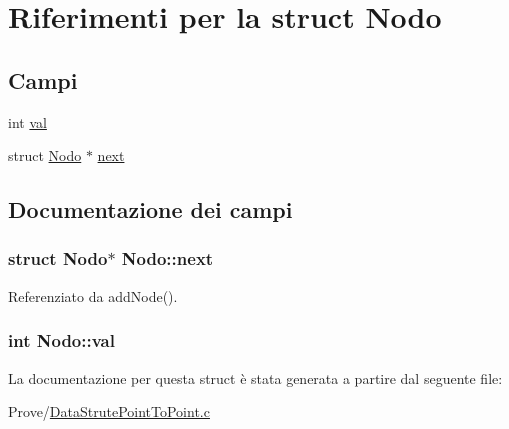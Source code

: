 \hypertarget{structNodo}{\section{Riferimenti per la struct Nodo}
\label{structNodo}
}
\subsection*{Campi}
\begin{DoxyCompactItemize}
\item 
int \hyperlink{structNodo_a8b3b2d0588fbc13d39d42ddcd0bd7a4f}{val}
\item 
struct \hyperlink{structNodo}{Nodo} $\ast$ \hyperlink{structNodo_a2cf9f6e7df85ad3e124ba92fcb784ad3}{next}
\end{DoxyCompactItemize}


\subsection{Documentazione dei campi}
\hypertarget{structNodo_a2cf9f6e7df85ad3e124ba92fcb784ad3}{
\subsubsection[{next}]{\setlength{\rightskip}{0pt plus 5cm}struct {\bf Nodo}$\ast$ Nodo\+::next}}\label{structNodo_a2cf9f6e7df85ad3e124ba92fcb784ad3}


Referenziato da add\+Node().

\hypertarget{structNodo_a8b3b2d0588fbc13d39d42ddcd0bd7a4f}{
\subsubsection[{val}]{\setlength{\rightskip}{0pt plus 5cm}int Nodo\+::val}}\label{structNodo_a8b3b2d0588fbc13d39d42ddcd0bd7a4f}


La documentazione per questa struct è stata generata a partire dal seguente file\+:\begin{DoxyCompactItemize}
\item 
Prove/\hyperlink{DataStrutePointToPoint_8c}{Data\+Strute\+Point\+To\+Point.\+c}\end{DoxyCompactItemize}
